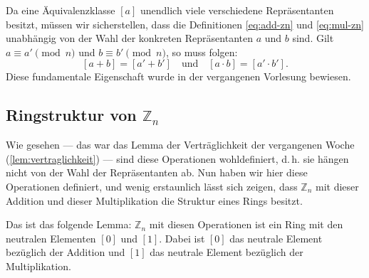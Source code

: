 \begin{math-stroke}


\begin{explanation-of-steps}[Wohldefiniertheit]
Da eine Äquivalenzklasse $[a]$ unendlich viele verschiedene Repräsentanten besitzt, müssen wir sicherstellen, dass die Definitionen \eqref{eq:add-zn} und \eqref{eq:mul-zn} unabhängig von der Wahl der konkreten Repräsentanten $a$ und $b$ sind. Gilt $a \equiv a' \pmod n$ und $b \equiv b' \pmod n$, so muss folgen:
\[
[a + b] = [a' + b'] \quad \text{und} \quad [a \cdot b] = [a' \cdot b'].
\]
Diese fundamentale Eigenschaft wurde in der vergangenen Vorlesung bewiesen.
\end{explanation-of-steps}
\end{math-stroke}

\subsection{Ringstruktur von \texorpdfstring{$\mathbb{Z}_n$}{Zn}}

\begin{spoken-clean}[00:07:36 - 00:09:39]
Wie gesehen --- das war das Lemma der Verträglichkeit der vergangenen Woche (\cref{lem:vertraglichkeit}) --- sind diese Operationen wohldefiniert, d.\,h. sie hängen nicht von der Wahl der Repräsentanten ab. Nun haben wir hier diese Operationen definiert, und wenig erstaunlich lässt sich zeigen, dass $\mathbb{Z}_n$ mit dieser Addition und dieser Multiplikation die Struktur eines Rings besitzt.

Das ist das folgende Lemma: $\mathbb{Z}_n$ mit diesen Operationen ist ein Ring mit den neutralen Elementen $[0]$ und $[1]$. Dabei ist $[0]$ das neutrale Element bezüglich der Addition und $[1]$ das neutrale Element bezüglich der Multiplikation.
\end{spoken-clean}

